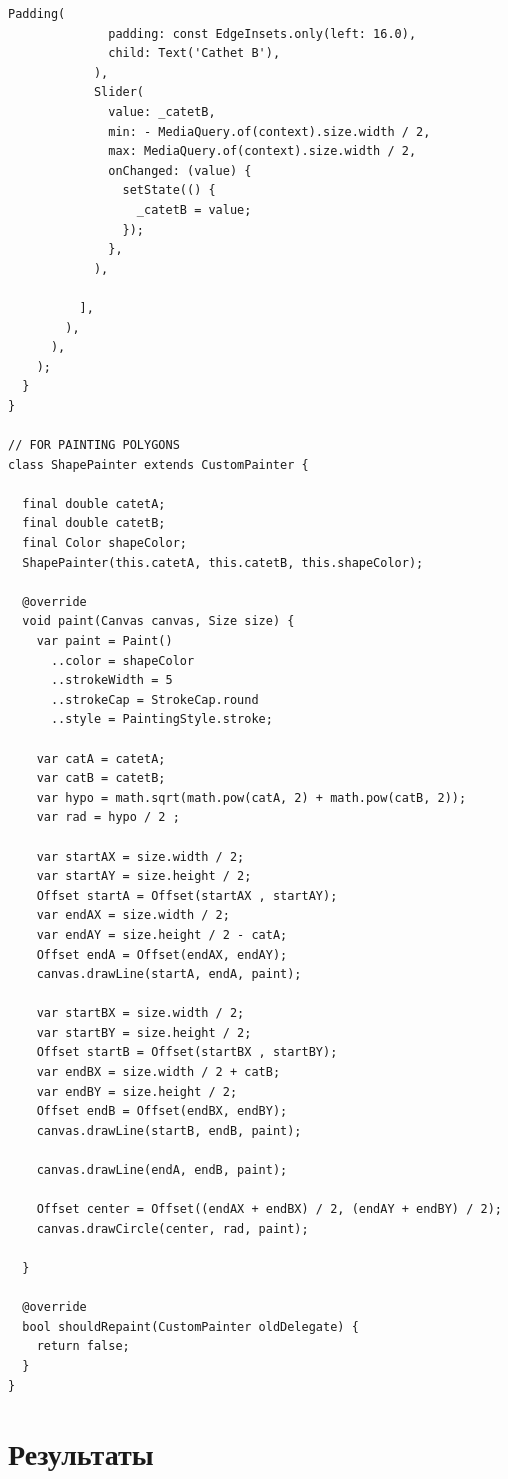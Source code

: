\documentclass[a4paper, 14pt]{extarticle}
\begin{document}
\begin{lstlisting}[language={},caption={Графический пользовательский интерфейс в Dart},label={lst:code1}]
            Padding(
              padding: const EdgeInsets.only(left: 16.0),
              child: Text('Cathet B'),
            ),
            Slider(
              value: _catetB,
              min: - MediaQuery.of(context).size.width / 2,
              max: MediaQuery.of(context).size.width / 2,
              onChanged: (value) {
                setState(() {
                  _catetB = value;
                });
              },
            ),

          ],
        ),
      ),
    );
  }
}

// FOR PAINTING POLYGONS
class ShapePainter extends CustomPainter {

  final double catetA;
  final double catetB;
  final Color shapeColor;
  ShapePainter(this.catetA, this.catetB, this.shapeColor);

  @override
  void paint(Canvas canvas, Size size) {
    var paint = Paint()
      ..color = shapeColor
      ..strokeWidth = 5
      ..strokeCap = StrokeCap.round
      ..style = PaintingStyle.stroke;

    var catA = catetA;
    var catB = catetB;
    var hypo = math.sqrt(math.pow(catA, 2) + math.pow(catB, 2));
    var rad = hypo / 2 ;

    var startAX = size.width / 2;
    var startAY = size.height / 2;
    Offset startA = Offset(startAX , startAY);
    var endAX = size.width / 2;
    var endAY = size.height / 2 - catA;
    Offset endA = Offset(endAX, endAY);
    canvas.drawLine(startA, endA, paint);

    var startBX = size.width / 2;
    var startBY = size.height / 2;
    Offset startB = Offset(startBX , startBY);
    var endBX = size.width / 2 + catB;
    var endBY = size.height / 2;
    Offset endB = Offset(endBX, endBY);
    canvas.drawLine(startB, endB, paint);

    canvas.drawLine(endA, endB, paint);

    Offset center = Offset((endAX + endBX) / 2, (endAY + endBY) / 2);
    canvas.drawCircle(center, rad, paint);

  }

  @override
  bool shouldRepaint(CustomPainter oldDelegate) {
    return false;
  }
}

\end{lstlisting}

\section{Результаты}\label{Sect::res}
\end{document}
